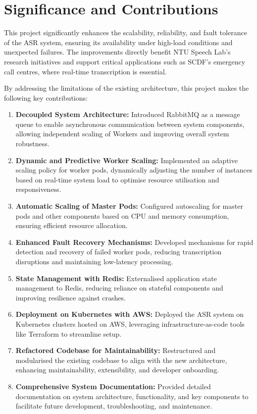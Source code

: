 \section{Significance and Contributions}
This project significantly enhances the scalability, reliability, and fault tolerance of the ASR system, ensuring its availability under high-load conditions and unexpected failures. The improvements directly benefit NTU Speech Lab's research initiatives and support critical applications such as SCDF's emergency call centres, where real-time transcription is essential. 

By addressing the limitations of the existing architecture, this project makes the following key contributions:

\begin{enumerate}
    \item \textbf{Decoupled System Architecture:} Introduced RabbitMQ as a message queue to enable asynchronous communication between system components, allowing independent scaling of Workers and improving overall system robustness.
    
    \item \textbf{Dynamic and Predictive Worker Scaling:} Implemented an adaptive scaling policy for worker pods, dynamically adjusting the number of instances based on real-time system load to optimise resource utilisation and responsiveness.

    \item \textbf{Automatic Scaling of Master Pods:} Configured autoscaling for master pods and other components based on CPU and memory consumption, ensuring efficient resource allocation.

    \item \textbf{Enhanced Fault Recovery Mechanisms:} Developed mechanisms for rapid detection and recovery of failed worker pods, reducing transcription disruptions and maintaining low-latency processing.

    \item \textbf{State Management with Redis:} Externalised application state management to Redis, reducing reliance on stateful components and improving resilience against crashes.

    \item \textbf{Deployment on Kubernetes with AWS:} Deployed the ASR system on Kubernetes clusters hosted on AWS, leveraging infrastructure-as-code tools like Terraform to streamline setup.

    \item \textbf{Refactored Codebase for Maintainability:} Restructured and modularised the existing codebase to align with the new architecture, enhancing maintainability, extensibility, and developer onboarding.

    \item \textbf{Comprehensive System Documentation:} Provided detailed documentation on system architecture, functionality, and key components to facilitate future development, troubleshooting, and maintenance.
\end{enumerate}


